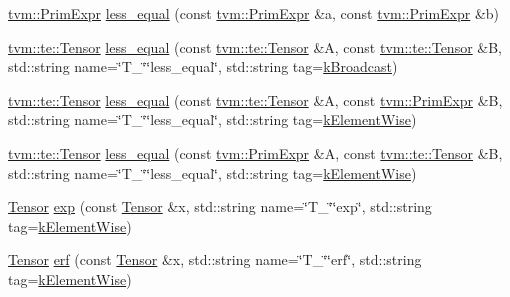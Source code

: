 \begin{DoxyCompactItemize}
\item 
\hyperlink{classtvm_1_1PrimExpr}{tvm\+::\+Prim\+Expr} \hyperlink{namespacetopi_a7ca4a60628a697c7e589d2fe78984650}{less\+\_\+equal} (const \hyperlink{classtvm_1_1PrimExpr}{tvm\+::\+Prim\+Expr} \&a, const \hyperlink{classtvm_1_1PrimExpr}{tvm\+::\+Prim\+Expr} \&b)
\item 
\hyperlink{classtvm_1_1te_1_1Tensor}{tvm\+::te\+::\+Tensor} \hyperlink{namespacetopi_a7606c738f17b2e3551ac1ae7ed9a1b1c}{less\+\_\+equal} (const \hyperlink{classtvm_1_1te_1_1Tensor}{tvm\+::te\+::\+Tensor} \&A, const \hyperlink{classtvm_1_1te_1_1Tensor}{tvm\+::te\+::\+Tensor} \&B, std\+::string name=\char`\"{}T\+\_\+\char`\"{}\char`\"{}less\+\_\+equal\char`\"{}, std\+::string tag=\hyperlink{namespacetopi_a794b9155e9ba9d1c9c42a1cff1fb645f}{k\+Broadcast})
\item 
\hyperlink{classtvm_1_1te_1_1Tensor}{tvm\+::te\+::\+Tensor} \hyperlink{namespacetopi_a3f1327711603ec3e437e3bbf83ce543e}{less\+\_\+equal} (const \hyperlink{classtvm_1_1te_1_1Tensor}{tvm\+::te\+::\+Tensor} \&A, const \hyperlink{classtvm_1_1PrimExpr}{tvm\+::\+Prim\+Expr} \&B, std\+::string name=\char`\"{}T\+\_\+\char`\"{}\char`\"{}less\+\_\+equal\char`\"{}, std\+::string tag=\hyperlink{namespacetopi_ac1b34ed59d38a5f5338bee6b2cad42be}{k\+Element\+Wise})
\item 
\hyperlink{classtvm_1_1te_1_1Tensor}{tvm\+::te\+::\+Tensor} \hyperlink{namespacetopi_adae651be9016267aab069698c2df1d78}{less\+\_\+equal} (const \hyperlink{classtvm_1_1PrimExpr}{tvm\+::\+Prim\+Expr} \&A, const \hyperlink{classtvm_1_1te_1_1Tensor}{tvm\+::te\+::\+Tensor} \&B, std\+::string name=\char`\"{}T\+\_\+\char`\"{}\char`\"{}less\+\_\+equal\char`\"{}, std\+::string tag=\hyperlink{namespacetopi_ac1b34ed59d38a5f5338bee6b2cad42be}{k\+Element\+Wise})
\item 
\hyperlink{classtvm_1_1te_1_1Tensor}{Tensor} \hyperlink{namespacetopi_a6c81e9f70678673736d57a3951eb5a27}{exp} (const \hyperlink{classtvm_1_1te_1_1Tensor}{Tensor} \&x, std\+::string name=\char`\"{}T\+\_\+\char`\"{}\char`\"{}exp\char`\"{}, std\+::string tag=\hyperlink{namespacetopi_ac1b34ed59d38a5f5338bee6b2cad42be}{k\+Element\+Wise})
\item 
\hyperlink{classtvm_1_1te_1_1Tensor}{Tensor} \hyperlink{namespacetopi_a53573f63480717b1d30c474c0ca4ec2f}{erf} (const \hyperlink{classtvm_1_1te_1_1Tensor}{Tensor} \&x, std\+::string name=\char`\"{}T\+\_\+\char`\"{}\char`\"{}erf\char`\"{}, std\+::string tag=\hyperlink{namespacetopi_ac1b34ed59d38a5f5338bee6b2cad42be}{k\+Element\+Wise})
\item 

\end{DoxyCompactItemize}
